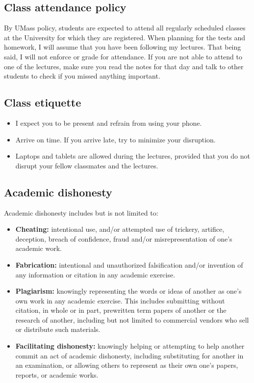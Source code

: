 \documentclass[11pt]{article}
\begin{document}
\subsection*{Class attendance policy}
\label{sec:org8a3450d}
By UMass policy, students are expected to attend all regularly scheduled
classes at the University for which they are registered. When planning for the
tests and homework, I will assume that you have been following my lectures.
That being said, I will not enforce or grade for attendance. If you are not
able to attend to one of the lectures, make sure you read the notes for that
day and talk to other students to check if you missed anything important.

\subsection*{Class etiquette}
\label{sec:org99331b1}
\begin{itemize}
\item I expect you to be present and refrain from using your phone.
\item Arrive on time. If you arrive late, try to minimize your disruption.
\item Laptops and tablets are allowed during the lectures, provided that you do not
disrupt your fellow classmates and the lectures.
\end{itemize}

\subsection*{Academic dishonesty}
\label{sec:org3feab8d}

Academic dishonesty includes but is not limited to: 
\begin{itemize}
\item \textbf{Cheating:} intentional use, and/or attempted use of trickery, artifice,
deception, breach of confidence, fraud and/or misrepresentation of one's
academic work.
\item \textbf{Fabrication:} intentional and unauthorized falsification and/or invention of
any information or citation in any academic exercise.
\item \textbf{Plagiarism:} knowingly representing the words or ideas of another as one's
own work in any academic exercise. This includes submitting without citation,
in whole or in part, prewritten term papers of another or the research of
another, including but not limited to commercial vendors who sell or
distribute such materials.
\item \textbf{Facilitating dishonesty:} knowingly helping or attempting to help another
commit an act of academic dishonesty, including substituting for another in
an examination, or allowing others to represent as their own one's papers,
reports, or academic works.
\end{itemize}
\end{document}
